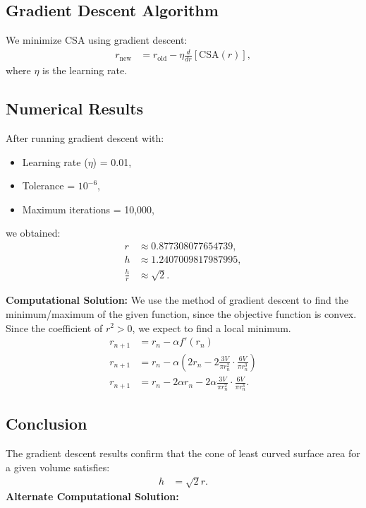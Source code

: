 \documentclass[article]{IEEEtran}
\numberwithin{figure}{enumi}
\begin{document}
\subsection*{Gradient Descent Algorithm}

We minimize CSA using gradient descent:
\begin{align}
r_{\text{new}} &= r_{\text{old}} - \eta \frac{d}{dr}[\text{CSA}(r)],
\end{align}
where \(\eta\) is the learning rate.

\subsection*{Numerical Results}

After running gradient descent with:
\begin{itemize}
    \item Learning rate (\(\eta\)) = 0.01,
    \item Tolerance = \(10^{-6}\),
    \item Maximum iterations = 10,000,
\end{itemize}
we obtained:
\begin{align}
r &\approx 0.877308077654739, \\
h &\approx 1.2407009817987995, \\
\frac{h}{r} &\approx \sqrt{2}.
\end{align}


    \item \textbf{Computational Solution:}
    We use the method of gradient descent to find the minimum/maximum of the given function, since the objective function is convex. Since the coefficient of $r^2 > 0$, we expect to find a local minimum.
   \begin{align}
    r_{n+1} &= r_n - \alpha f'(r_n) \\
    r_{n+1} &= r_n - \alpha \left( 2r_n - 2 \frac{3V}{\pi r_n^2} \cdot \frac{6V}{\pi r_n^3} \right) \\
    r_{n+1} &= r_n - 2\alpha r_n - 2\alpha \frac{3V}{\pi r_n^2} \cdot \frac{6V}{\pi r_n^3}.
\end{align}

    \subsection*{Conclusion}

The gradient descent results confirm that the cone of least curved surface area for a given volume satisfies:
\begin{align}
h &= \sqrt{2}r.
\end{align}
\textbf{Alternate Computational Solution: }\newline
\end{document}
